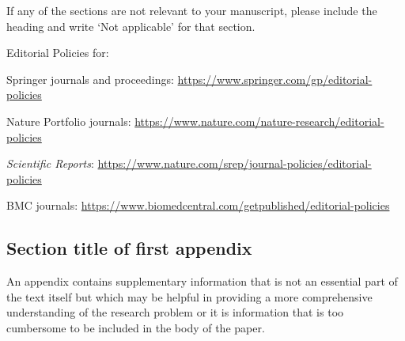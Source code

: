 \documentclass[pdflatex,sn-mathphys-num]{sn-jnl}%
\theoremstyle{thmstyleone}%
\theoremstyle{thmstyletwo}%
\theoremstyle{thmstylethree}%
\begin{document}
\noindent
If any of the sections are not relevant to your manuscript, please include the heading and write `Not applicable' for that section. 

\bigskip
\begin{flushleft}%
Editorial Policies for:

\bigskip\noindent
Springer journals and proceedings: \url{https://www.springer.com/gp/editorial-policies}

\bigskip\noindent
Nature Portfolio journals: \url{https://www.nature.com/nature-research/editorial-policies}

\bigskip\noindent
\textit{Scientific Reports}: \url{https://www.nature.com/srep/journal-policies/editorial-policies}

\bigskip\noindent
BMC journals: \url{https://www.biomedcentral.com/getpublished/editorial-policies}
\end{flushleft}

\begin{appendices}

\section{Section title of first appendix}\label{secA1}

An appendix contains supplementary information that is not an essential part of the text itself but which may be helpful in providing a more comprehensive understanding of the research problem or it is information that is too cumbersome to be included in the body of the paper.




\end{appendices}
\end{document}
